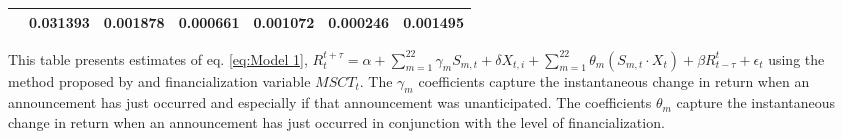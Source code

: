\begin{sidewaystable}
{\begin{tabular}{@{}lllllllllllll@{}}
&\multicolumn{2}{c}{ 0.031393 }                                                 & \multicolumn{2}{c}{ 0.001878 }                                                 & \multicolumn{2}{c}{ 0.000661 }                                                 & \multicolumn{2}{c}{ 0.001072 }                                                 & \multicolumn{2}{c}{ 0.000246 }                                                   & \multicolumn{2}{c}{ 0.001495 }                                                 \\ \bottomrule 
\end{tabular}
}
\begin{tablenotes}\item 
    \singlespacing
    \footnotesize
    This table presents estimates of eq. \ref{eq:Model 1}, $R_{t}^{t+\tau}=\alpha+\sum_{m=1}^{22} \gamma_m S_{m,t}+ \delta X_{t,i} + \sum_{m=1}^{22} \theta_m (S_{m,t} \cdot X_t)+\beta R_{t-\tau}^{t}+\epsilon_{t}$ using the method proposed by \citet{andersen2007real} and financialization variable $MSCT_t$. The $\gamma_m$ coefficients capture the instantaneous change in return when an announcement has just occurred and especially if that announcement was unanticipated. The coefficients $\theta_m$ capture the instantaneous change in return when an announcement has just occurred in conjunction with the level of financialization.
\end{tablenotes}
\end{sidewaystable}

